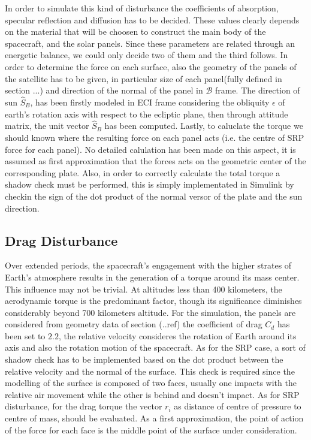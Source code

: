In order to simulate this kind of disturbance the coefficients of absorption, specular reflection and diffusion
has to be decided. These values clearly depends on the material that will be choosen to construct the main body
of the spacecraft, and the solar panels. Since these parameters are related through an energetic balance, we could 
only decide two of them and the third follows. In order to determine the force on each surface, also the geometry of
the panels of the satellite has to be given, in particular size of each 
panel(fully defined in section ...) and direction of the normal of the panel
in $\mathcal{B}$ frame. The direction of sun $\hat{S}_B$, has been firstly modeled in ECI frame considering the obliquity
$\epsilon$ of earth's rotation axis with respect to the ecliptic plane, then through attitude matrix, the unit vector $\hat{S}_B$
has been computed. Lastly, to caluclate the torque we should known where the resulting force on each panel acts (i.e. the centre of
SRP force for each panel). No detailed calulation has been made on this aspect, it is assumed as first approximation that the 
forces acts on the geometric center of the corresponding plate. Also, in order to correctly calculate the total
torque a shadow check must be performed, this is simply implementated in Simulink by checkin the sign
of the dot product of the normal versor of the plate and the sun direction.


\subsection{Drag Disturbance}
\label{subsec:dist_drag}

Over extended periods, the spacecraft's engagement with the higher strates of Earth's atmosphere results
in the generation of a torque around its mass center. This influence may not be trivial. At altitudes 
less than 400 kilometers, the aerodynamic torque is the predominant factor, though its significance diminishes 
considerably beyond 700 kilometers altitude. For the simulation, the panels are considered from geometry data of section (..ref)
the coefficient of drag $C_d$ has been set to $2.2$, the relative velocity consideres the rotation of Earth around its axis and also 
the rotation motion of the spacecraft. As for the SRP case, a sort of shadow check has to be implemented based on the dot product between 
the relative velocity and the normal of the surface. This check is required since the modelling of the surface is composed of two faces, usually
one impacts with the relative air movement while the other is behind and doesn't impact. As for SRP disturbance, for the drag torque the 
vector $r_i$ as distance of centre of pressure to centre of mass, should be evaluated. As a first approximation, the point of action of the 
force for each face is the middle point of the surface under consideration.


